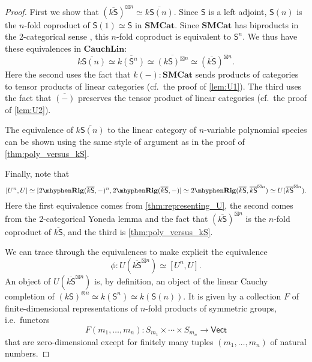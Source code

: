 \documentclass[12pt,reqno]{amsart}
\theoremstyle{plain}
\theoremstyle{definition}
\theoremstyle{remark}
\newcommand{\maps}{\colon}
\newcommand{\category}[1]{\mathsf{#1}}
\renewcommand{\S}{\category S}
\newcommand{\namedcat}[1]{\mathsf{#1}}
\newcommand{\SMC}{\namedbicat{SMCat}}
\newcommand{\TRig}{2\mhyphen\namedbicat{Rig}}
\newcommand{\Vect}{\namedcat{Vect}}
\newcommand{\namedbicat}[1]{\mathbf{#1}}
\newcommand{\Lin}{\namedbicat{Lin}}
\newcommand{\Cauch}{\namedbicat{Cauch}}
\newcommand{\ksbar}{\overline{k\S}}
\numberwithin{thm}{section}
\begin{document}
\begin{proof}
    First we show that $(\ksbar)^{\boxtimes n} \simeq \overline{k\S(n)}$. Since $\S$ is a left adjoint, $\S(n)$ is the $n$-fold coproduct of $\S(1) \simeq \S$ in $\SMC$. Since $\SMC$ has biproducts in the 2-categorical sense \cite[Thm.\ 2.3]{FongSpivak}, this $n$-fold coproduct is equivalent to $\S^n$. We thus have these equivalences in $\Cauch\Lin$:
    \[   \overline{k\S(n)} \simeq \overline{k(\S^n)} \simeq 
    \overline{(k\S)^{\boxtimes n}} \simeq (\ksbar)^{\boxtimes n} .\]
    Here the second uses the fact that $k(-) \maps \SMC$ sends products of categories to tensor products of linear categories (cf.\ the proof of \cref{lem:U1}). The third uses the fact that $\overline{(-)}$ preserves the tensor product of linear categories (cf.\ the proof of \cref{lem:U2}). 
    
    The equivalence of $\overline{k\S(n)}$ to the linear category of $n$-variable polynomial species can be shown using the same style of argument as in the proof of \cref{thm:poly_versus_kS}.
    
    Finally, note that 
    \[
        [U^n, U] \simeq 
        [\TRig(\ksbar, -)^n, 
        \TRig(\ksbar, -) ] \simeq
        \TRig(\ksbar, \ksbar^{\boxtimes n}) \simeq U(\ksbar^{\boxtimes n}).
    \] 
    Here the first equivalence comes from  \cref{thm:representing_U}, the second comes from the 2-categorical Yoneda lemma and the fact that $(\ksbar)^{\boxtimes n}$ is the $n$-fold coproduct of $\ksbar$, and the third is \cref{thm:poly_versus_kS}. 
    
    We can trace through the equivalences to make explicit the equivalence 
    \[ \phi \maps U(\ksbar^{\boxtimes n}) \simeq [U^n, U]. \]
    An object of $U(\ksbar^{\boxtimes n})$ is, by definition, an object of the linear Cauchy completion of $(k \S)^{\otimes n} \simeq k(\S^n) \simeq k(\S(n))$. It is given by a collection $F$ of finite-dimensional representations of $n$-fold products of symmetric groups, i.e.\ functors 
    \[ F(m_1, \ldots, m_n) \maps S_{m_1} \times \cdots \times S_{m_n} \to \Vect\] 
    that are zero-dimensional except for finitely many tuples $(m_1, \ldots, m_n)$ of natural numbers. 
    

\end{proof}
\end{document}

